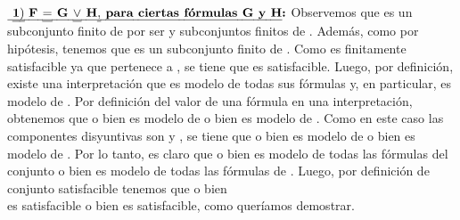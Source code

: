\begin{isabellebody}
\begin{isamarkuptext}
\begin{demostracion}
      $\textbf{\isa{{\isasymone}{\isacharparenright}\ F\ {\isacharequal}\ G\ {\isasymor}\ H{\isacharcomma}\ para\ ciertas\ fórmulas\ G\ y\ H}:}$ Observemos que  es un 
      subconjunto finito de  por ser  y  subconjuntos finitos de . Además, como 
       por hipótesis, tenemos que  es un subconjunto finito de . Como  es 
      finitamente satisfacible ya que pertenece a , se tiene que  es satisfacible. 
      Luego, por definición, existe una interpretación \isa{{\isasymA}} que es modelo de todas sus fórmulas y, 
      en particular, \isa{{\isasymA}} es modelo de . Por definición del valor de una fórmula en una
      interpretación, obtenemos que o bien \isa{{\isasymA}} es modelo de  o bien \isa{{\isasymA}} es modelo de .
      Como en este caso las componentes disyuntivas son  y , se tiene que o bien \isa{{\isasymA}}
      es modelo de  o bien \isa{{\isasymA}} es modelo de . Por lo tanto, es claro que o bien \isa{{\isasymA}} es
      modelo de todas las fórmulas del conjunto  o bien es modelo de todas las fórmulas
      de . Luego, por definición de conjunto satisfacible tenemos que o bien\\ 
       es satisfacible o bien  es satisfacible, como queríamos demostrar.


\end{demostracion}
\end{isamarkuptext}
\end{isabellebody}
